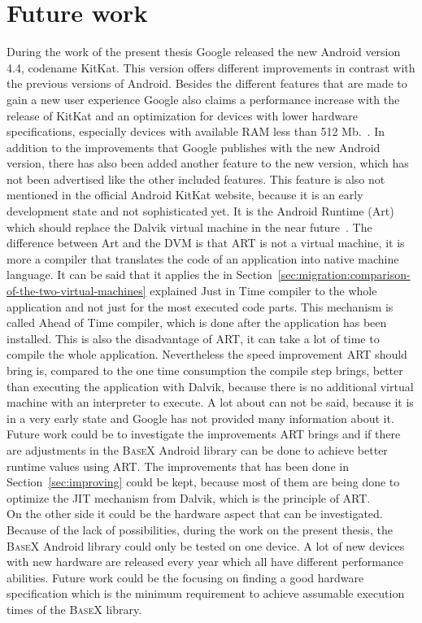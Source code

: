 \section{Future work}
\label{sec:summery:future-work}
During the work of the present thesis Google released the new Android version 4.4, codename KitKat.
This version offers different improvements in contrast with the previous versions of Android.
Besides the different features that are made to gain a new user experience Google also claims a performance increase with the release of KitKat and an optimization for devices with lower hardware specifications, especially devices with available RAM less than 512 Mb.~\cite{google-kitkat}.
In addition to the improvements that Google publishes with the new Android version, there has also been added another feature to the new version, which has not been advertised like the other included features.
This feature is also not mentioned in the official Android KitKat website, because it is an early development state and not sophisticated yet.
It is the Android Runtime (Art) which should replace the Dalvik virtual machine in the near future~\cite{android-art}.
The difference between Art and the DVM is that ART is not a virtual machine, it is more a compiler that translates the code of an application into native machine language.
It can be said that it applies the in Section~\ref{sec:migration:comparison-of-the-two-virtual-machines} explained Just in Time compiler to the whole application and not just for the most executed code parts.
This mechanism is called Ahead of Time compiler, which is done after the application has been installed.
This is also the disadvantage of ART, it can take a lot of time to compile the whole application.
Nevertheless the speed improvement ART should bring is, compared to the one time consumption the compile step brings, better than executing the application with Dalvik, because there is no additional virtual machine with an interpreter to execute.
A lot about can not be said, because it is in a very early state and Google has not provided many information about it.
Future work could be to investigate the improvements ART brings and if there are adjustments in the \textsc{BaseX} Android library can be done to achieve better runtime values using ART.
The improvements that has been done in Section~\ref{sec:improving} could be kept, because most of them are being done to optimize the JIT mechanism from Dalvik, which is the principle of ART.\\
On the other side it could be the hardware aspect that can be investigated.
Because of the lack of possibilities, during the work on the present thesis, the \textsc{BaseX} Android library could only be tested on one device.
A lot of new devices with new hardware are released every year which all have different performance abilities.
Future work could be the focusing on finding a good hardware specification which is the minimum requirement to achieve assumable execution times of the \textsc{BaseX} library.
